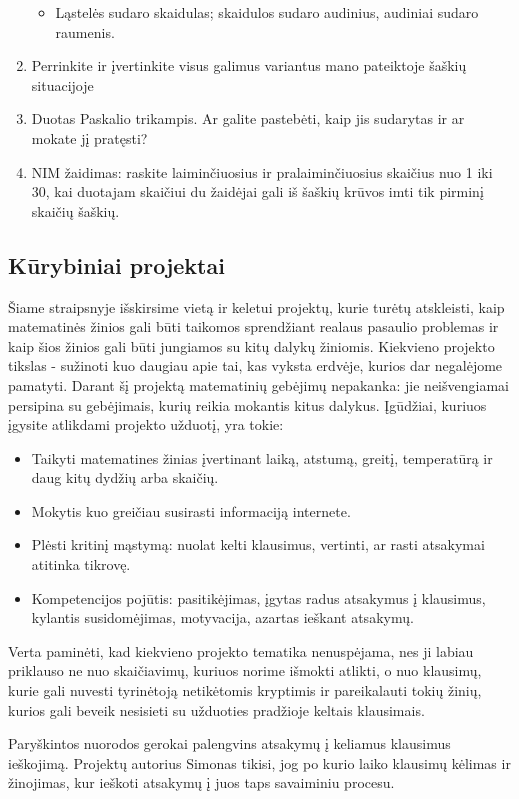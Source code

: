 \documentclass[a4paper]{article}
\begin{document}
\begin{enumerate}
\begin{itemize}
\item Ląstelės sudaro skaidulas; skaidulos sudaro audinius, audiniai sudaro raumenis.
\end{itemize}
\item Perrinkite ir įvertinkite visus galimus variantus mano pateiktoje šaškių situacijoje
\item Duotas Paskalio trikampis. Ar galite pastebėti, kaip jis sudarytas ir ar mokate jį pratęsti? 
\item NIM žaidimas: raskite laiminčiuosius ir pralaiminčiuosius skaičius nuo 1 iki 30, kai duotajam skaičiui du žaidėjai gali iš šaškių krūvos imti tik pirminį skaičių šaškių.
\end{enumerate}
\newpage
\subsection{Kūrybiniai projektai}
Šiame straipsnyje išskirsime vietą ir keletui projektų, kurie turėtų atskleisti, kaip matematinės žinios gali būti taikomos sprendžiant realaus pasaulio problemas ir kaip šios žinios gali būti jungiamos su kitų dalykų žiniomis. Kiekvieno projekto tikslas - sužinoti kuo daugiau apie tai, kas vyksta erdvėje, kurios dar negalėjome pamatyti. Darant šį projektą matematinių gebėjimų nepakanka: jie neišvengiamai persipina su gebėjimais, kurių reikia mokantis kitus dalykus. Įgūdžiai, kuriuos įgysite atlikdami projekto užduotį, yra tokie:
\begin{itemize}
\item Taikyti matematines žinias įvertinant laiką, atstumą, greitį, temperatūrą ir daug kitų dydžių arba skaičių.
\item Mokytis kuo greičiau susirasti informaciją internete.
\item Plėsti kritinį mąstymą: nuolat kelti klausimus, vertinti, ar rasti atsakymai atitinka tikrovę.
\item Kompetencijos pojūtis: pasitikėjimas, įgytas radus atsakymus į klausimus, kylantis susidomėjimas, motyvacija, azartas ieškant atsakymų.
\end{itemize}
Verta paminėti, kad kiekvieno projekto tematika nenuspėjama, nes ji labiau priklauso ne nuo skaičiavimų, kuriuos norime išmokti atlikti, o nuo klausimų, kurie gali nuvesti tyrinėtoją netikėtomis kryptimis ir pareikalauti tokių žinių, kurios gali beveik nesisieti su užduoties pradžioje keltais klausimais.

Paryškintos nuorodos gerokai palengvins atsakymų į keliamus klausimus ieškojimą. Projektų autorius Simonas tikisi, jog po kurio laiko klausimų kėlimas ir žinojimas, kur ieškoti atsakymų į juos taps savaiminiu procesu. 
\end{document}
